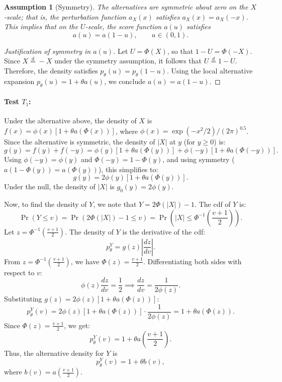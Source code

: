 \documentclass[12pt]{article}
\theoremstyle{remark}
\theoremstyle{plain}
\newtheorem{assumption}{Assumption}
\begin{document}
\begin{assumption}[Symmetry]
	\label{ass:symm}
	The alternatives are symmetric about zero on the \( X \)-scale; that is, the perturbation function \( a_X(x) \) satisfies \( a_X(x) = a_X(-x) \). This implies that on the \( U \)-scale, the score function \( a(u) \) satisfies
	\[
	a(u) = a(1 - u), \qquad u \in (0,1).
	\]
\end{assumption}

\begin{proof}[Justification of symmetry in \( a(u) \)]
	Let \( U = \Phi(X) \), so that \( 1 - U = \Phi(-X) \). Since \( X \overset{d}{=} -X \) under the symmetry assumption, it follows that \( U \overset{d}{=} 1 - U \). Therefore, the density satisfies \( p_\theta(u) = p_\theta(1 - u) \). Using the local alternative expansion \( p_\theta(u) = 1 + \theta a(u) \), we conclude \( a(u) = a(1 - u) \). \qedhere
\end{proof}


\paragraph{Test $T_1$:}

Under the alternative above, the density of \(X\) is \(f(x) = \phi(x) [1 + \theta a(\Phi(x))]\), where $\phi(x)=\exp(-x^2/2)/(2\pi)^{0.5}$. Since the alternative is symmetric, the density of \(|X|\) at \(y\) (for \(y \geq 0\)) is:
\[
g(y) = f(y) + f(-y) = \phi(y) [1 + \theta a(\Phi(y))] + \phi(-y) [1 + \theta a(\Phi(-y))].
\]
Using \(\phi(-y) = \phi(y)\) and \(\Phi(-y) = 1 - \Phi(y)\), and using  symmetry (\(a(1-\Phi(y)) = a(\Phi(y))\)), this simplifies to:
\[
g(y) = 2\phi(y) [1 + \theta a(\Phi(y))].
\]
Under the null, the density of \(|X|\) is \(g_0(y) = 2\phi(y)\).

Now, to find the density of \(Y\), we note that \(Y = 2\Phi(|X|) - 1\). The cdf of \(Y\) is:
\[
{\Pr}(Y \leq v) = {\Pr}\left(2\Phi(|X|) - 1 \leq v\right) = {\Pr}\left(|X| \leq \Phi^{-1}\left(\frac{v+1}{2}\right)\right).
\]
Let \(z = \Phi^{-1}\left(\frac{v+1}{2}\right)\). The density of \(Y\) is the derivative of the cdf:
\[
p^Y_\theta = g(z)  \left| \frac{dz}{dv} \right|.
\]
From \(z = \Phi^{-1}\left(\frac{v+1}{2}\right)\), we have \(\Phi(z) = \frac{v+1}{2}\). Differentiating both sides with respect to \(v\):
\[
\phi(z) \frac{dz}{dv} = \frac{1}{2} \implies \frac{dz}{dv} = \frac{1}{2\phi(z)}.
\]
Substituting \(g(z) = 2\phi(z) [1 + \theta a(\Phi(z))]\):
\[
p^Y_\theta(v) = 2\phi(z) [1 + \theta a(\Phi(z))] \cdot \frac{1}{2\phi(z)} = 1 + \theta a(\Phi(z)).
\]
Since \(\Phi(z) = \frac{v+1}{2}\), we get:
\[
p^Y_\theta(v) = 1 + \theta a\left( \frac{v+1}{2} \right).
\]
Thus, the alternative density for \(Y\) is 
\[p^Y_{\theta}(v) = 1 + \theta b(v),\] 
where \(b(v) = a\left( \frac{v+1}{2} \right)\).
\end{document}
